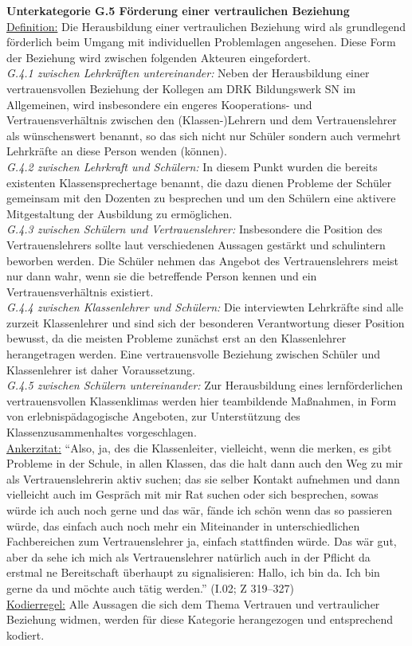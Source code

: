 \noindent
\textbf{Unterkategorie G.5 Förderung einer vertraulichen Beziehung}\\
\underline{Definition:} Die Herausbildung einer vertraulichen Beziehung wird als grundlegend förderlich beim Umgang mit individuellen Problemlagen angesehen. Diese Form der Beziehung wird zwischen folgenden Akteuren eingefordert.\\
\textit{G.4.1 zwischen Lehrkräften untereinander:} Neben der Herausbildung einer vertrauensvollen Beziehung der Kollegen am DRK Bildungswerk SN im Allgemeinen, wird insbesondere ein engeres Kooperations- und Vertrauensverhältnis zwischen den (Klassen-)Lehrern und dem Vertrauenslehrer als wünschenswert benannt, so das sich nicht nur Schüler sondern auch vermehrt Lehrkräfte an diese Person wenden (können).\\
\textit{G.4.2 zwischen Lehrkraft und Schülern:} In diesem Punkt wurden die bereits existenten Klassensprechertage benannt, die dazu dienen Probleme der Schüler gemeinsam mit den Dozenten zu besprechen und um den Schülern eine aktivere Mitgestaltung der Ausbildung zu ermöglichen.\\
\textit{G.4.3 zwischen Schülern und Vertrauenslehrer:} Insbesondere die Position des Vertrauenslehrers sollte laut verschiedenen Aussagen gestärkt und schulintern beworben werden. Die Schüler nehmen das Angebot des Vertrauenslehrers meist nur dann wahr, wenn sie die betreffende Person kennen und ein Vertrauensverhältnis existiert.\\
\textit{G.4.4 zwischen Klassenlehrer und Schülern:} Die interviewten Lehrkräfte sind alle zurzeit Klassenlehrer und sind sich der besonderen Verantwortung dieser Position bewusst, da die meisten Probleme zunächst erst an den Klassenlehrer herangetragen werden. Eine vertrauensvolle Beziehung zwischen Schüler und Klassenlehrer ist daher Voraussetzung.\\
\textit{G.4.5 zwischen Schülern untereinander:} Zur Herausbildung eines lernförderlichen vertrauensvollen Klassenklimas werden hier teambildende Maßnahmen, in Form von erlebnispädagogische Angeboten, zur Unterstützung des Klassenzusammenhaltes vorgeschlagen.\\
\underline{Ankerzitat:} "`Also, ja, des die Klassenleiter, vielleicht, wenn die merken, es gibt Probleme in der Schule, in allen Klassen, das die halt dann auch den Weg zu mir als Vertrauenslehrerin aktiv suchen; das sie selber Kontakt aufnehmen und dann vielleicht auch im Gespräch mit mir Rat suchen oder sich besprechen, sowas würde ich auch noch gerne und das wär, fände ich schön wenn das so passieren würde, das einfach auch noch mehr ein Miteinander in unterschiedlichen Fachbereichen zum Vertrauenslehrer ja, einfach stattfinden würde. Das wär gut, aber da sehe ich mich als Vertrauenslehrer natürlich auch in der Pflicht da erstmal ne Bereitschaft überhaupt zu signalisieren: Hallo, ich bin da. Ich bin gerne da und möchte auch tätig werden."' (I.02; Z 319--327)\\
\underline{Kodierregel:} Alle Aussagen die sich dem Thema Vertrauen und vertraulicher Beziehung widmen, werden für diese Kategorie herangezogen und entsprechend kodiert.\\

